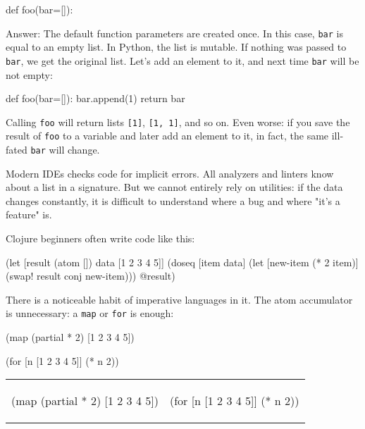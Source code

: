 \begin{python}
def foo(bar=[]):
\end{python}

Answer: The default function parameters are created once. In this case, \verb|bar| is equal to an empty list. In Python, the list is mutable. If nothing was passed to \verb|bar|, we get the original list. Let's add an element to it, and next time \verb|bar| will be not empty:

\begin{python}
def foo(bar=[]):
    bar.append(1)
    return bar
\end{python}

Calling \verb|foo| will return lists \verb|[1]|, \verb|[1, 1]|, and so on. Even worse: if you save the result of \verb|foo| to a variable and later add an element to it, in fact, the same ill-fated \verb|bar| will change.

Modern IDEs checks code for implicit errors.
All analyzers and linters know about a list in a signature. But we cannot entirely rely on utilities: if the data changes constantly, it is difficult to understand where a bug and where "it's a feature" is.

Clojure beginners often write code like this:

\begin{clojure}
(let [result (atom [])
      data [1 2 3 4 5]]
  (doseq [item data]
    (let [new-item (* 2 item)]
      (swap! result conj new-item)))
  @result)
\end{clojure}


\noindent
There is a noticeable habit of imperative languages in it. The atom accumulator is unnecessary: a \verb|map| or \verb|for| is enough:

\ifx\DEVICETYPE\MOBILE

\begin{clojure}
(map (partial * 2)
     [1 2 3 4 5])
\end{clojure}

\splitter

\begin{clojure}
(for [n [1 2 3 4 5]]
  (* n 2))
\end{clojure}

\else


\noindent
\begin{tabular}{ @{}p{5cm} @{}p{5cm} }

\begin{clojure}
(map (partial * 2)
     [1 2 3 4 5])
\end{clojure}

&

\begin{clojure}
(for [n [1 2 3 4 5]]
  (* n 2))
\end{clojure}

\end{tabular}


